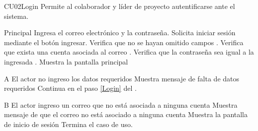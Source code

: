 
% 



	\begin{UseCase}{CU02}{Login}{
		Permite al colaborador y líder de proyecto autentificarse ante el sistema.
	}
	\end{UseCase}
	\begin{UCtrayectoria}{Principal}
		\UCpaso[\UCactor] Ingresa el correo electrónico y la contraseña.\label{Login}
		\UCpaso[\UCactor] Solicita iniciar sesión mediante el botón ingresar.
		\UCpaso Verifica que no se hayan omitido campos  .
       \UCpaso  Verifica que exista una cuenta asociada al correo	.
       \UCpaso  Verifica que la contraseña sea igual a la ingresada .
       \UCpaso Muestra la pantalla principal
	\end{UCtrayectoria}

		\begin{UCtrayectoriaA}{A}{ El actor no ingreso los datos requeridos}
			\UCpaso Muestra mensaje de falta de datos requeridos
			\UCpaso Continua en el paso \ref{Login} del .
		\end{UCtrayectoriaA}
        
		\begin{UCtrayectoriaA}{B}{ El actor ingreso un correo que no está asociada a ninguna cuenta}
			\UCpaso Muestra mensaje de que el correo no está asociado a ninguna cuenta
			\UCpaso Muestra la pantalla de inicio de sesión
            \UCpaso[] Termina el caso de uso.
		\end{UCtrayectoriaA}
		        

